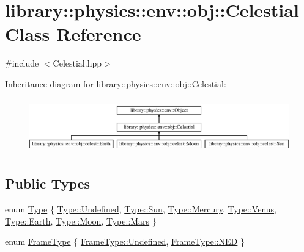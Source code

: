 \hypertarget{classlibrary_1_1physics_1_1env_1_1obj_1_1_celestial}{}\section{library\+:\+:physics\+:\+:env\+:\+:obj\+:\+:Celestial Class Reference}
\label{classlibrary_1_1physics_1_1env_1_1obj_1_1_celestial}


{\ttfamily \#include $<$Celestial.\+hpp$>$}

Inheritance diagram for library\+:\+:physics\+:\+:env\+:\+:obj\+:\+:Celestial\+:\begin{figure}[H]
\begin{center}
\leavevmode
\includegraphics[height=2.403433cm]{classlibrary_1_1physics_1_1env_1_1obj_1_1_celestial}
\end{center}
\end{figure}
\subsection*{Public Types}
\begin{DoxyCompactItemize}
\item 
enum \hyperlink{classlibrary_1_1physics_1_1env_1_1obj_1_1_celestial_aab1f58aa727e639288d65f3d33c4f245}{Type} \{ \newline
\hyperlink{classlibrary_1_1physics_1_1env_1_1obj_1_1_celestial_aab1f58aa727e639288d65f3d33c4f245aec0fc0100c4fc1ce4eea230c3dc10360}{Type\+::\+Undefined}, 
\hyperlink{classlibrary_1_1physics_1_1env_1_1obj_1_1_celestial_aab1f58aa727e639288d65f3d33c4f245aef6572e4cd58bb39a3f4e82fc64fe9f0}{Type\+::\+Sun}, 
\hyperlink{classlibrary_1_1physics_1_1env_1_1obj_1_1_celestial_aab1f58aa727e639288d65f3d33c4f245a34dae487e31f37aa74633258b7774d4f}{Type\+::\+Mercury}, 
\hyperlink{classlibrary_1_1physics_1_1env_1_1obj_1_1_celestial_aab1f58aa727e639288d65f3d33c4f245a0bdc508a17811a3a860d32749ad44e4b}{Type\+::\+Venus}, 
\newline
\hyperlink{classlibrary_1_1physics_1_1env_1_1obj_1_1_celestial_aab1f58aa727e639288d65f3d33c4f245a5cdd21c97f86686cc505e02fd32a7523}{Type\+::\+Earth}, 
\hyperlink{classlibrary_1_1physics_1_1env_1_1obj_1_1_celestial_aab1f58aa727e639288d65f3d33c4f245ad502a50ed945d5fca74e0105575b5b34}{Type\+::\+Moon}, 
\hyperlink{classlibrary_1_1physics_1_1env_1_1obj_1_1_celestial_aab1f58aa727e639288d65f3d33c4f245a671f028142280b556a85ffdd90e0a43d}{Type\+::\+Mars}
 \}
\item 
enum \hyperlink{classlibrary_1_1physics_1_1env_1_1obj_1_1_celestial_a8585fb32125cb6c73ae1339a5ea09c79}{Frame\+Type} \{ \hyperlink{classlibrary_1_1physics_1_1env_1_1obj_1_1_celestial_a8585fb32125cb6c73ae1339a5ea09c79aec0fc0100c4fc1ce4eea230c3dc10360}{Frame\+Type\+::\+Undefined}, 
\hyperlink{classlibrary_1_1physics_1_1env_1_1obj_1_1_celestial_a8585fb32125cb6c73ae1339a5ea09c79acd3459b28418fa8fa75ffaba4f3e7c74}{Frame\+Type\+::\+N\+ED}
 \}
\end{DoxyCompactItemize}
